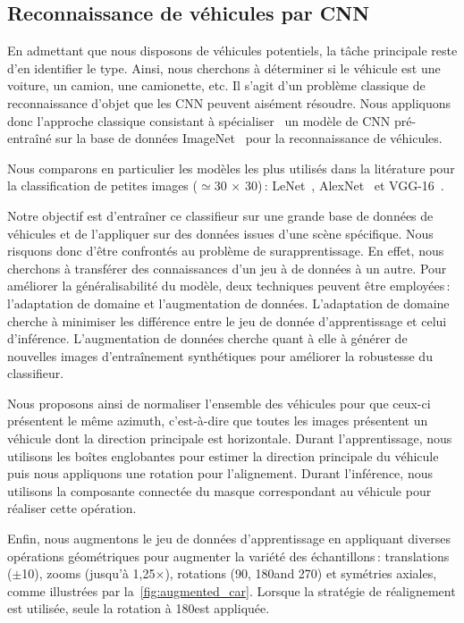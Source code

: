 \subsection{Reconnaissance de véhicules par \gls{CNN}}

En admettant que nous disposons de véhicules potentiels, la tâche principale reste d'en identifier le type. Ainsi, nous cherchons à déterminer si le véhicule est une voiture, un camion, une camionette, etc. Il s'agit d'un problème classique de reconnaissance d'objet que les \gls{CNN} peuvent aisément résoudre. Nous appliquons donc l'approche classique consistant à spécialiser~\cite{nogueira_towards_2016,zhou_deep_2016} un modèle de \gls{CNN} pré-entraîné sur la base de données ImageNet~\cite{russakovsky_imagenet_2015} pour la reconnaissance de véhicules.

Nous comparons en particulier les modèles les plus utilisés dans la litérature pour la classification de petites images ($\simeq$30 $\times$ 30)\,: LeNet~\cite{lecun_gradient-based_1998}, AlexNet~\cite{krizhevsky_imagenet_2012} et VGG-16~\cite{simonyan_very_2014}.

Notre objectif est d'entraîner ce classifieur sur une grande base de données de véhicules et de l'appliquer sur des données issues d'une scène spécifique. Nous risquons donc d'être confrontés au problème de surapprentissage. En effet, nous cherchons à transférer des connaissances d'un jeu à de données à un autre. Pour améliorer la généralisabilité du modèle, deux techniques peuvent être employées\,: l'adaptation de domaine et l'augmentation de données. L'adaptation de domaine cherche à minimiser les différence entre le jeu de donnée d'apprentissage et celui d'inférence. L'augmentation de données cherche quant à elle à générer de nouvelles images d'entraînement synthétiques pour améliorer la robustesse du classifieur.

Nous proposons ainsi de normaliser l'ensemble des véhicules pour que ceux-ci présentent le même azimuth, c'est-à-dire que toutes les images présentent un véhicule dont la direction principale est horizontale. Durant l'apprentissage, nous utilisons les boîtes englobantes pour estimer la direction principale du véhicule puis nous appliquons une rotation pour l'alignement. Durant l'inférence, nous utilisons la composante connectée du masque correspondant au véhicule pour réaliser cette opération.

Enfin, nous augmentons le jeu de données d'apprentissage en appliquant diverses opérations géométriques pour augmenter la variété des échantillons\,: translations ($\pm$\SI{10}{\px}), zooms (jusqu'à 1,25$\times$), rotations (90\degre, 180\degre and 270\degre) et symétries axiales, comme illustrées par la~\cref{fig:augmented_car}. Lorsque la stratégie de réalignement est utilisée, seule la rotation à 180\degre est appliquée.

